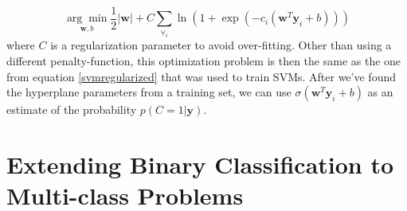 \begin{equation}
\label{logisticreg}
\underset{\mathbf{w}, b}{\arg \min} \frac{1}{2}|\mathbf{w}|+C\sum_{\forall_i} \ln(1+\exp(-c_i(\mathbf{w}^T\mathbf{y}_i+b)))
\end{equation}
where $C$ is a regularization parameter to avoid over-fitting. Other than using a different penalty-function, this optimization problem is then the same as the one from equation \ref{svmregularized} that was used to train SVMs. After we've found the hyperplane parameters from a training set, we can use $\sigma(\mathbf{w}^T\mathbf{y}_i+b)$ as an estimate of the probability $p(C=1|\mathbf{y})$.

\section{Extending Binary Classification to Multi-class Problems}


